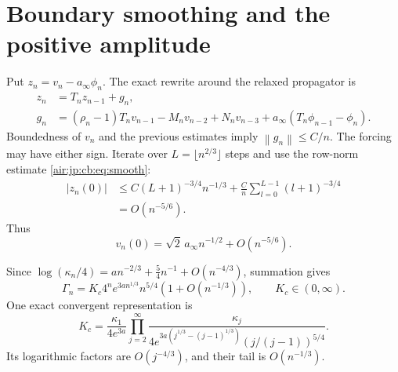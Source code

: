 \documentclass[11pt,letterpaper]{article}
\numberwithin{equation}{section}
\theoremstyle{remark}
\newcommand{\norm}[1]{\left\lVert#1\right\rVert}
\begin{document}
\section{Boundary smoothing and the positive amplitude}\label{air:jp:cb:sec:constant}
Put $z_n=v_n-a_\infty\phi_n$. The exact rewrite around the relaxed propagator is
\begin{align*}
 z_n&=T_nz_{n-1}+g_n,\\
 g_n&=(\rho_n-1)T_nv_{n-1}-M_nv_{n-2}+N_nv_{n-3}
       +a_\infty(T_n\phi_{n-1}-\phi_n).
\end{align*}
Boundedness of $v_n$ and the previous estimates imply $\norm{g_n}\le C/n$. The forcing may have either sign. Iterate over $L=\lfloor n^{2/3}\rfloor$ steps and use the row-norm estimate \eqref{air:jp:cb:eq:smooth}:
\begin{align*}
 |z_n(0)|&\le C(L+1)^{-3/4}n^{-1/3}
       +\frac Cn\sum_{l=0}^{L-1}(l+1)^{-3/4}\\
 &=O(n^{-5/6}).
\end{align*}
Thus
\begin{equation}\label{air:jp:cb:eq:endpoint}
 v_n(0)=\sqrt2\,a_\infty n^{-1/2}+O(n^{-5/6}).
\end{equation}

Since $\log(\kappa_n/4)=an^{-2/3}+\tfrac54n^{-1}+O(n^{-4/3})$, summation gives
\begin{equation}\label{air:jp:cb:eq:product}
 \Gamma_n=K_c4^ne^{3an^{1/3}}n^{5/4}(1+O(n^{-1/3})),\qquad K_c\in(0,\infty).
\end{equation}
One exact convergent representation is
\begin{equation}\label{air:jp:cb:eq:K}
 K_c=\frac{\kappa_1}{4e^{3a}}
 \prod_{j=2}^\infty
 \frac{\kappa_j}{4e^{3a(j^{1/3}-(j-1)^{1/3})}(j/(j-1))^{5/4}}.
\end{equation}
Its logarithmic factors are $O(j^{-4/3})$, and their tail is $O(n^{-1/3})$.
\end{document}
